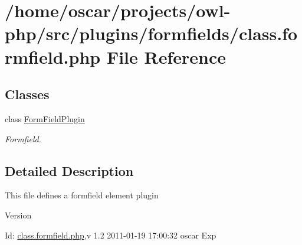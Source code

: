 \section{/home/oscar/projects/owl-\/php/src/plugins/formfields/class.formfield.php File Reference}
\label{class_8formfield_8php}
\subsection*{Classes}
\begin{DoxyCompactItemize}
\item 
class \hyperlink{classFormFieldPlugin}{FormFieldPlugin}
\begin{DoxyCompactList}\small\item\em Formfield. \item\end{DoxyCompactList}\end{DoxyCompactItemize}


\subsection{Detailed Description}
This file defines a formfield element plugin \begin{DoxyVersion}{Version}

\end{DoxyVersion}
\begin{DoxyParagraph}{Id:}
\hyperlink{class_8formfield_8php}{class.formfield.php},v 1.2 2011-\/01-\/19 17:00:32 oscar Exp 
\end{DoxyParagraph}
